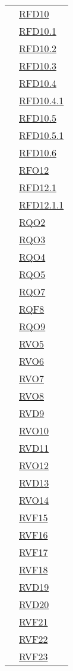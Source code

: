 \begin{longtable}{|>{\centering}m{5cm}|m{5cm}<{\centering}|}
& \hyperlink{RFD10}{RFD10}\\
& \hyperlink{RFD10.1}{RFD10.1}\\
& \hyperlink{RFD10.2}{RFD10.2}\\
& \hyperlink{RFD10.3}{RFD10.3}\\
& \hyperlink{RFD10.4}{RFD10.4}\\
& \hyperlink{RFD10.4.1}{RFD10.4.1}\\
& \hyperlink{RFD10.5}{RFD10.5}\\
& \hyperlink{RFD10.5.1}{RFD10.5.1}\\
& \hyperlink{RFD10.6}{RFD10.6}\\
& \hyperlink{RFO12}{RFO12}\\
& \hyperlink{RFD12.1}{RFD12.1}\\
& \hyperlink{RFD12.1.1}{RFD12.1.1}\\
& \hyperlink{RQO2}{RQO2}\\
& \hyperlink{RQO3}{RQO3}\\
& \hyperlink{RQO4}{RQO4}\\
& \hyperlink{RQO5}{RQO5}\\
& \hyperlink{RQO7}{RQO7}\\
& \hyperlink{RQF8}{RQF8}\\
& \hyperlink{RQO9}{RQO9}\\
& \hyperlink{RVO5}{RVO5}\\
& \hyperlink{RVO6}{RVO6}\\
& \hyperlink{RVO7}{RVO7}\\
& \hyperlink{RVO8}{RVO8}\\
& \hyperlink{RVD9}{RVD9}\\
& \hyperlink{RVO10}{RVO10}\\
& \hyperlink{RVD11}{RVD11}\\
& \hyperlink{RVO12}{RVO12}\\
& \hyperlink{RVD13}{RVD13}\\
& \hyperlink{RVO14}{RVO14}\\
& \hyperlink{RVF15}{RVF15}\\
& \hyperlink{RVF16}{RVF16}\\
& \hyperlink{RVF17}{RVF17}\\
& \hyperlink{RVF18}{RVF18}\\
& \hyperlink{RVD19}{RVD19}\\
& \hyperlink{RVD20}{RVD20}\\
& \hyperlink{RVF21}{RVF21}\\
& \hyperlink{RVF22}{RVF22}\\
& \hyperlink{RVF23}{RVF23}\\

\end{longtable}
